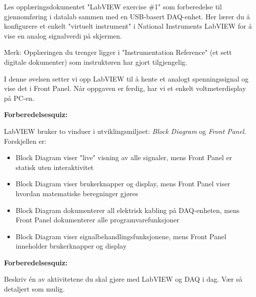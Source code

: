 

Les opplæringsdokumentet "LabVIEW exercise \#1" som forberedelse til gjennomføring i datalab sammen med en USB-basert DAQ-enhet. Her lærer du å konfigurere et enkelt "virtuelt instrument" i National Instruments LabVIEW for å vise en analog signalverdi på skjermen.

\vskip 10pt

Merk: Opplæringen du trenger ligger i "Instrumentation Reference" (et sett digitale dokumenter) som instruktøren har gjort tilgjengelig.














I denne øvelsen setter vi opp LabVIEW til å hente et analogt spenningssignal og vise det i Front Panel. Når oppgaven er ferdig, har vi et enkelt voltmeterdisplay på PC-en.

\vfil \eject

\noindent
{\bf Forberedelsesquiz:}

LabVIEW bruker to vinduer i utviklingsmiljøet: {\it Block Diagram} og {\it Front Panel}. Forskjellen er:

\begin{itemize}
\item{} Block Diagram viser "live" visning av alle signaler, mens Front Panel er statisk uten interaktivitet
\vskip 10pt
\item{} Block Diagram viser brukerknapper og display, mens Front Panel viser hvordan matematiske beregninger gjøres
\vskip 10pt
\item{} Block Diagram dokumenterer all elektrisk kabling på DAQ-enheten, mens Front Panel dokumenterer alle programvarefunksjoner
\vskip 10pt
\item{} Block Diagram viser signalbehandlingsfunksjonene, mens Front Panel inneholder brukerknapper og display
\end{itemize}

\vfil \eject

\noindent
{\bf Forberedelsesquiz:}

Beskriv én av aktivitetene du skal gjøre med LabVIEW og DAQ i dag. Vær så detaljert som mulig.



